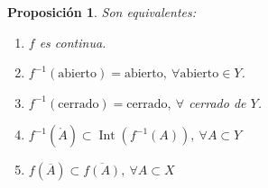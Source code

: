 \documentclass[10pt,a4paper,openright]{book}
\theoremstyle{break}
\newtheorem*{prop}{Proposición}
\DeclareMathOperator{\inter}{Int}
\begin{document}
\begin{prop}
Son equivalentes:
\begin{enumerate}
    \item $f$ es continua.
    \item $f^{-1}\left( \text{abierto}  \right) = \text{abierto} ,\ \forall \text{abierto} \in Y$.
    \item $f^{-1}\left( \text{cerrado} \right) = \text{cerrado},\ \forall $ cerrado de $Y$.
    \item $f^{-1}\left( \mathring{A} \right) \subset \inter\left( f^{-1}\left( A \right) \right),\ \forall A \subset Y$
    \item $f\left( \overline{A} \right) \subset \overline{f\left( A \right)},\ \forall A \subset X$
\end{enumerate}
\end{prop}
\end{document}
